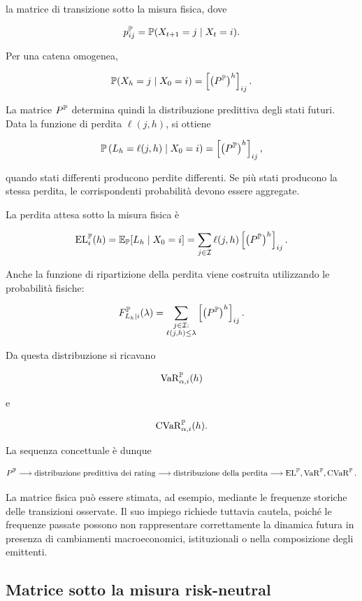 la matrice di transizione sotto la misura fisica, dove

\[
p_{ij}^{\mathbb{P}}
=
\mathbb{P}(X_{t+1}=j\mid X_t=i).
\]

Per una catena omogenea,

\[
\mathbb{P}(X_h=j\mid X_0=i)
=
\left[
\left(P^{\mathbb{P}}\right)^h
\right]_{ij}.
\]

La matrice $P^{\mathbb{P}}$ determina quindi la distribuzione predittiva
degli stati futuri. Data la funzione di perdita $\ell(j,h)$, si
ottiene

\[
\mathbb{P}
\left(
L_h=\ell(j,h)
\mid X_0=i
\right)
=
\left[
\left(P^{\mathbb{P}}\right)^h
\right]_{ij},
\]

quando stati differenti producono perdite differenti. Se pi\`{u}
stati producono la stessa perdita, le corrispondenti probabilit\`{a}
devono essere aggregate.

La perdita attesa sotto la misura fisica \`{e}

\[
\mathrm{EL}_{i}^{\mathbb{P}}(h)
=
\mathbb{E}_{\mathbb{P}}[L_h\mid X_0=i]
=
\sum_{j\in\mathcal{I}}
\ell(j,h)
\left[
\left(P^{\mathbb{P}}\right)^h
\right]_{ij}.
\]

Anche la funzione di ripartizione della perdita viene costruita
utilizzando le probabilit\`{a} fisiche:

\[
F_{L_h\mid i}^{\mathbb{P}}(\lambda)
=
\sum_{\substack{j\in\mathcal{I}:\\
\ell(j,h)\leq\lambda}}
\left[
\left(P^{\mathbb{P}}\right)^h
\right]_{ij}.
\]

Da questa distribuzione si ricavano

\[
\operatorname{VaR}_{\alpha,i}^{\mathbb{P}}(h)
\]

e

\[
\operatorname{CVaR}_{\alpha,i}^{\mathbb{P}}(h).
\]

La sequenza concettuale \`{e} dunque

\[
P^{\mathbb{P}}
\longrightarrow
\text{distribuzione predittiva dei rating}
\longrightarrow
\text{distribuzione della perdita}
\longrightarrow
\mathrm{EL}^{\mathbb{P}},
\operatorname{VaR}^{\mathbb{P}},
\operatorname{CVaR}^{\mathbb{P}}.
\]

La matrice fisica pu\`{o} essere stimata, ad esempio, mediante le
frequenze storiche delle transizioni osservate. Il suo impiego
richiede tuttavia cautela, poich\'{e} le frequenze passate possono
non rappresentare correttamente la dinamica futura in presenza di
cambiamenti macroeconomici, istituzionali o nella composizione degli
emittenti.

\subsection{Matrice sotto la misura risk-neutral}

